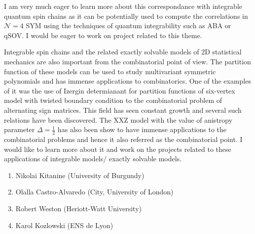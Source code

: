 \documentclass[a4paper, 11pt, DIV=15]{scrarticle}
\begin{document}
\begin{description}[left=0pt]
I am very much eager to learn more about this correspondance with integrable quantum spin chains as it can be potentially used to compute the correlations in $\mathcal{N}=4$ SYM using the techniques of quantum integrability such as ABA or qSOV.
I would be eager to work on project related to this theme.
\item[Exactly solvable models and combinatorics]
Integrable spin chains and the related exactly solvable models of 2D statistical mechanics are also important from the combinatorial point of view.
The partition function of these models can be used to study multivariant symmetric polynomials and has immense applications to combinatorics.
One of the examples of it was the use of Izergin determianant for partition functions of six-vertex model with twisted boundary condition to the combinatorial problem of alternating sign matrices.
This field has seen constant growth and several such relations have been discovered.
The XXZ model with the value of anistropy parameter $\Delta=\frac{1}{2}$ has also been show to have immense applications to the combinatorial problems and hence it also referred as the combinatorial point.
I would like to learn more about it and work on the projects related to these applications of integrable models/ exactly solvable models.
\end{description}
\vspace{2\baselineskip}
\begin{enumerate}
    \item Nikolai Kitanine (University of Burgundy)
    \item Olalla Castro-Alvaredo (City, University of London)
    \item Robert Weston (Heriott-Watt University)
    \item Karol Kozlowski (ENS de Lyon)
\end{enumerate}
\end{document}
